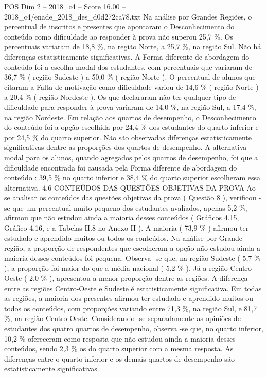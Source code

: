 \begin{textsample}{POS Dim 2 – 2018\_c4 – Score 16.00 – 2018\_c4/enade\_2018\_des\_d0d272ca78.txt}
Na análise por Grandes Regiões, o percentual de inscritos e presentes que apontaram o Desconhecimento do conteúdo como dificuldade ao responder à prova não superou 25,7 \%.
Os percentuais variaram de 18,8 \%, na região Norte, a 25,7 \%, na região Sul.
Não há diferenças estatisticamente significativas.
A Forma diferente de abordagem do conteúdo foi a escolha modal dos estudantes, com percentuais que variaram de 36,7 \% ( região Sudeste ) a 50,0 \% ( região Norte ).
O percentual de alunos que citaram a Falta de motivação como dificuldade variou de 14,6 \% ( região Norte ) a 20,4 \% ( região Nordeste ).
Os que declararam não ter qualquer tipo de dificuldade para responder à prova variaram de 14,0 \%, na região Sul, a 17,4 \%, na região Nordeste.
Em relação aos quartos de desempenho, o Desconhecimento do conteúdo foi a opção escolhida por 24,4 \% dos estudantes do quarto inferior e por 24,5 \% do quarto superior.
Não são observadas diferenças estatisticamente significativas dentre as proporções dos quartos de desempenho.
A alternativa modal para os alunos, quando agregados pelos quartos de desempenho, foi que a dificuldade encontrada foi causada pela Forma diferente de abordagem do conteúdo : 39,5 \% no quarto inferior e 38,4 \% do quarto superior escolheram essa alternativa. 4.6 CONTEÚDOS DAS QUESTÕES OBJETIVAS DA PROVA Ao se analisar os conteúdos das questões objetivas da prova ( Questão 8 ), verificou -se que um percentual muito pequeno dos estudantes avaliados, apenas 5,2 \%, afirmou que não estudou ainda a maioria desses conteúdos ( Gráficos 4.15, Gráfico 4.16, e a Tabelas II.8 no Anexo II ).
A maioria ( 73,9 \% ) afirmou ter estudado e aprendido muitos ou todos os conteúdos.
Na análise por Grande região, a proporção de respondentes que escolheram a opção não estudou ainda a maioria desses conteúdos foi pequena.
Observa -se que, na região Sudeste ( 5,7 \% ), a proporção foi maior do que a média nacional ( 5,2 \% ).
Já a região Centro-Oeste ( 2,0 \% ), apresentou a menor proporção dentre as regiões.
A diferença entre as regiões Centro-Oeste e Sudeste é estatisticamente significativa.
Em todas as regiões, a maioria dos presentes afirmou ter estudado e aprendido muitos ou todos os conteúdos, com proporções variando entre 71,3 \%, na região Sul, e 81,7 \%, na região Centro-Oeste.
Considerando -se separadamente as opiniões de estudantes dos quatro quartos de desempenho, observa -se que, no quarto inferior, 10,2 \% ofereceram como resposta que não estudou ainda a maioria desses conteúdos, sendo 2,3 \% os do quarto superior com a mesma resposta.
As diferenças entre o quarto inferior e os demais quartos de desempenho são estatisticamente significativas.

\end{textsample}
